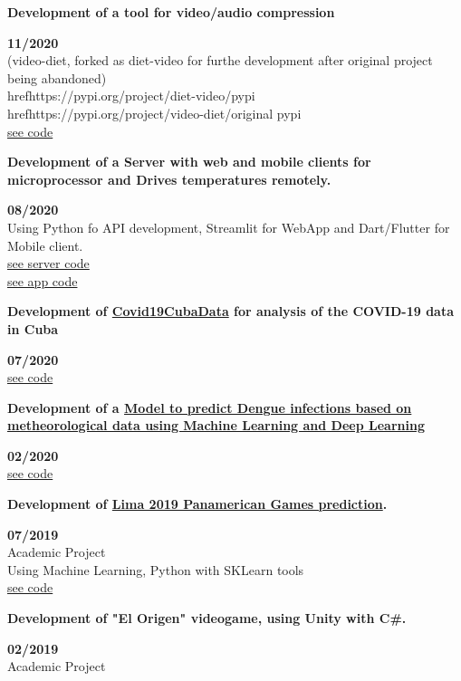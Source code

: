 \documentclass[a4paper,12pt]{article}
\begin{document}
\begin{minipage}{\textwidth}
\parbox{0.8\linewidth}{\textbf{Development of a tool for video/audio compression}} \hfill \textbf{11/2020}\\
(video-diet, forked as diet-video for furthe development after original project being abandoned)\\
href{https://pypi.org/project/diet-video/}{pypi}\\
href{https://pypi.org/project/video-diet/}{original pypi}\\
\href{https://github.com/JavierOramas/video-diet}{see code}\\
\end{minipage}
\begin{minipage}{\textwidth}
\parbox{0.8\linewidth}{\textbf{Development of a Server with web and mobile clients for microprocessor and Drives temperatures remotely.}} \hfill \textbf{08/2020}\\
Using Python fo API development, Streamlit for WebApp and Dart/Flutter for Mobile client.\\
\href{https://github.com/JavierOramas/temperatureMonitor}{see server code}\\
\href{https://github.com/JavierOramas/temperatureMonitor-app}{see app code}\\
\end{minipage}
\begin{minipage}{\textwidth}
\parbox{0.8\linewidth}{\textbf{Development of \hyperref[sec:covid]{Covid19CubaData} for analysis of the COVID-19 data in Cuba}} \hfill \textbf{07/2020}\\
\href{https://github.com/covid19cuba/covid19cuba-action}{see code}\\
\end{minipage}
\begin{minipage}{\textwidth}
\parbox{0.8\linewidth}{\textbf{Development of a \hyperref[sec:dengue]{Model to predict Dengue infections based on metheorological data using Machine Learning and Deep Learning}}} \hfill \textbf{02/2020}\\
\href{https://github.com/JavierOramas/DengAI}{see code}\\
\end{minipage}
\begin{minipage}{\textwidth}
\parbox{0.8\linewidth}{\textbf{Development of \hyperref[sec:panamerican]{Lima 2019 Panamerican Games prediction}.}} \hfill \textbf{07/2019}\\
Academic Project\\
Using Machine Learning,  Python with SKLearn tools\\
\href{https://github.com/JavierOramas/PanamericanPredictor}{see code}\\
\end{minipage}
\begin{minipage}{\textwidth}
\parbox{0.8\linewidth}{\textbf{Development of "El Origen" videogame, using Unity with C\#.}} \hfill \textbf{02/2019}\\
Academic Project\\
\end{minipage}
\end{document}
